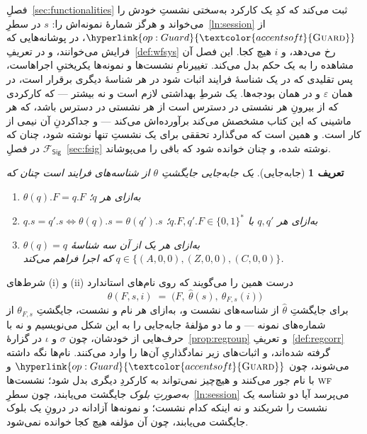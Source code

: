 \documentclass[10pt,oneside,openany]{book}
\newcommand{\WF}{\op{wf}}
\newcommand{\op}[1]{\textnormal{\textsc{#1}}}
\newcommand{\opl}[1]{\hyperlink{op:#1}{\textcolor{accentsoft}{\op{#1}}}}
\newcommand{\Fsig}{\mathcal{F}_{\mathsf{Sig}}}
\newcommand{\bits}{\{0,1\}^*}
\theoremstyle{accentdef}
\newtheorem{definition}{تعریف}[chapter]
\theoremstyle{accentplain}
\begin{document}
فصلِ~\ref{sec:functionalities} ثبت می‌کند که کدِ یک کارکرد به‌سختی نشستِ
خودش را می‌خواند و هرگز شمارهٔ نمونه‌اش را: $s$ در سطرِ~\ref{ln:session} از
$\opl{Guard}$، در پوشانه‌هایی که فرایش می‌خوانند، و در
تعریفِ~\ref{def:wfsys} رخ می‌دهد، و $i$ هیچ کجا. این فصل آن مشاهده را به یک
حکم بدل می‌کند. تغییرنامِ نشست‌ها و نمونه‌ها یکریختیِ اجراهاست، پس تقلیدی که
در یک شناسهٔ فرایند اثبات شود در هر شناسهٔ دیگری برقرار است، در همان
$\varepsilon$ و در همان بودجه‌ها. یک شرطِ بهداشتی لازم است و نه بیشتر ---
که کارکردی که از بیرونِ هر نشستی در دسترس است از هر نشستی در دسترس باشد، که
هر ماشینی که این کتاب مشخصش می‌کند برآورده‌اش می‌کند --- و جدا‌کردنِ آن
نیمی از کار است. و همین است که می‌گذارد تحققی برای یک نشستِ تنها نوشته
شود، چنان که $\Fsig$ در فصلِ~\ref{sec:fsig} نوشته شده، و چنان خوانده شود
که باقی را می‌پوشاند.

\begin{definition}[جابه‌جایی]\label{def:reloc}
یک \emph{جابه‌جایی} جایگشتِ $\theta$ از شناسه‌های فرایند است چنان که
\begin{enumerate}[label=(\roman*),leftmargin=2.2em]
  \item $\theta(q).F = q.F$ به‌ازای هر $q$؛
  \item $q.s = q'.s \iff \theta(q).s = \theta(q').s$ به‌ازای هر $q,q'$ با $q.F, q'.F \in \bits$؛
  \item $\theta(q) = q$ به‌ازای هر یک از آن سه شناسهٔ $q \in \{(A,0,0),(Z,0,0),(C,0,0)\}$ که
        اجرا فراهم می‌کند.
\end{enumerate}
\end{definition}

شرط‌های (i) و (ii) درست همین را می‌گویند که روی نام‌های استاندارد
\[
  \theta(F,s,i) \;=\; \bigl(F,\ \hat\theta(s),\ \theta_{F,s}(i)\bigr)
\]
برای جایگشتِ $\hat\theta$ از شناسه‌های نشست و، به‌ازای هر نام و نشست،
جایگشتِ $\theta_{F,s}$ از شماره‌های نمونه --- و ما دو مؤلفهٔ جابه‌جایی را به
این شکل می‌نویسیم و نه با حرف‌هایی از خودشان، چون $\sigma$ و $\iota$ در
گزارهٔ~\ref{prop:regroup} و تعریفِ~\ref{def:regcorr} گرفته شده‌اند، و
اثبات‌های زیر نمادگذاریِ آن‌ها را وارد می‌کنند. نام‌ها نگه داشته می‌شوند،
چون $\opl{Guard}$ و $\WF$ با نام جور می‌کنند و هیچ‌چیز نمی‌تواند به کارکردِ
دیگری بدل شود؛ نشست‌ها \emph{به‌صورتِ بلوک} جایگشت می‌یابند، چون
سطرِ~\ref{ln:session} می‌پرسد آیا دو شناسه یک نشست را شریکند و نه اینکه
کدام نشست؛ و نمونه‌ها آزادانه در درونِ یک بلوک جایگشت می‌یابند، چون آن
مؤلفه هیچ کجا خوانده نمی‌شود.
\end{document}
